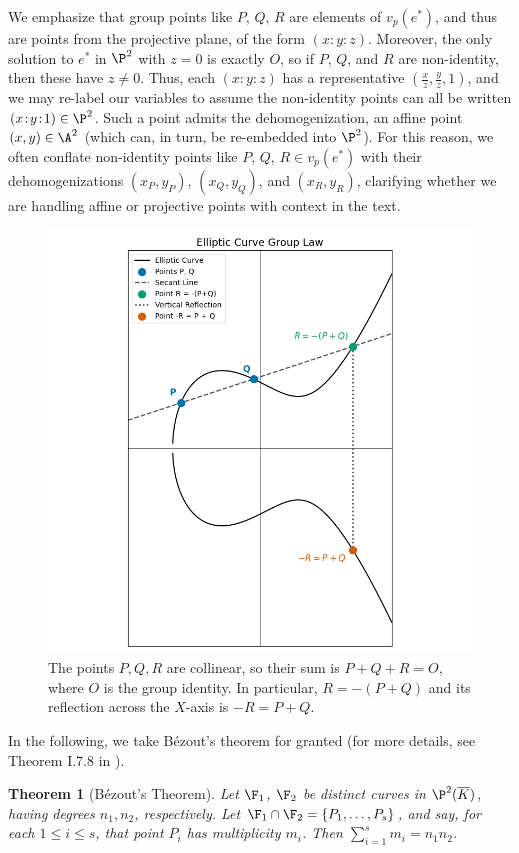 \documentclass[11pt,letterpaper]{article}
\newtheorem{thm}{Theorem}[section]
\theoremstyle{definition}
\newcommand{\6}{\mathbf}
\newcommand{\7}{\mathcal}
\begin{document}
We emphasize that group points like $P$, $Q$, $R$ are elements of $v_p(e^*)$, and thus are points from the projective plane, of the form $(x\!:\!y\!:\!z)$. Moreover, the only solution to $e^*$ in $\P^2$ with $z=0$ is exactly $O$, so if $P$, $Q$, and $R$ are non-identity, then these have $z \neq 0$. Thus, each $(x\!:\!y\!:\!z)$ has a representative $(\frac{x}{z}, \frac{y}{z}, 1)$, and we may re-label our variables to assume the non-identity points can all be written $(x\!:\!y\!:\!1) \in \P^2$. Such a point admits the dehomogenization, an affine point $(x,y) \in \A^2$ (which can, in turn, be re-embedded into $\P^2$). 
For this reason, we often conflate non-identity points like $P$, $Q$, $R \in v_p(e^*)$ with their dehomogenizations $(x_P, y_P)$, $(x_Q, y_Q)$, and $(x_R, y_R)$, clarifying whether we are handling affine or projective points with context in the text.


\begin{figure}[htbp]
\centering
\includegraphics[width=\textwidth]{ecg.png}
\caption{The points $P, Q, R$ are collinear, so their sum is $P + Q + R = O$, where $O$ is the group identity. In particular, $R = -(P+Q)$ and its reflection across the $X$-axis is $-R = P+Q$. \label{fig:grouplaw}}
\end{figure}

In the following, we take B\'{e}zout's theorem for granted (for more details, see Theorem I.7.8 in \cite{Hartshorne}).
\begin{thm}[{B}{\'{e}}zout's {T}heorem]
Let $\F_1$, $\F_2$ be distinct curves in $\P^2(\overline{K})$, having 
degrees $n_1, n_2$, respectively. Let $\F_1 \cap \F_2 = \left\{P_1, \ldots, P_s\right\}$, and say, for each $1 \leq i \leq s$, that point $P_i$ has multiplicity $m_i$. Then $\sum_{i=1}^{s} m_i = n_1n_2$. 
\end{thm}
\end{document}
